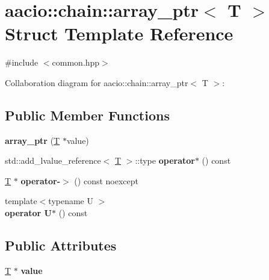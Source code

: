 \hypertarget{structaacio_1_1chain_1_1array__ptr}{}\section{aacio\+:\+:chain\+:\+:array\+\_\+ptr$<$ T $>$ Struct Template Reference}
\label{structaacio_1_1chain_1_1array__ptr}


{\ttfamily \#include $<$common.\+hpp$>$}



Collaboration diagram for aacio\+:\+:chain\+:\+:array\+\_\+ptr$<$ T $>$\+:
\subsection*{Public Member Functions}
\begin{DoxyCompactItemize}
\item 
\mbox{\label{structaacio_1_1chain_1_1array__ptr_a6568985291d727f3baaa8d58514b4a7a}} 
{\bfseries array\+\_\+ptr} (\mbox{\hyperlink{struct_t}{T}} $\ast$value)
\item 
\mbox{\label{structaacio_1_1chain_1_1array__ptr_aad2fc8ae65c23f25034c52438b2f9f68}} 
std\+::add\+\_\+lvalue\+\_\+reference$<$ \mbox{\hyperlink{struct_t}{T}} $>$\+::type {\bfseries operator$\ast$} () const
\item 
\mbox{\label{structaacio_1_1chain_1_1array__ptr_a4acd0230fb57b47540c83b08e016be47}} 
\mbox{\hyperlink{struct_t}{T}} $\ast$ {\bfseries operator-\/$>$} () const noexcept
\item 
\mbox{\label{structaacio_1_1chain_1_1array__ptr_a947807d643526c424e6712df4367087e}} 
{\footnotesize template$<$typename U $>$ }\\{\bfseries operator U$\ast$} () const
\end{DoxyCompactItemize}
\subsection*{Public Attributes}
\begin{DoxyCompactItemize}
\item 
\mbox{\label{structaacio_1_1chain_1_1array__ptr_a44d97e2be15a65f1d9ce23c38da2c775}} 
\mbox{\hyperlink{struct_t}{T}} $\ast$ {\bfseries value}
\end{DoxyCompactItemize}


